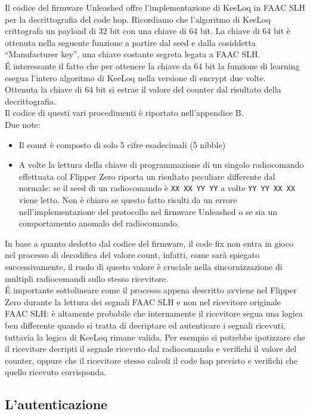 Il codice del firmware Unleashed offre l’implementazione di KeeLoq in FAAC SLH per la decrittografia del code hop. Ricordiamo che l’algoritmo di KeeLoq crittografa un payload di 32 bit con una chiave di 64 bit. La chiave di 64 bit è ottenuta nella seguente funzione a partire dal seed e dalla cosiddetta “Manufacturer key”, una chiave costante segreta legata a FAAC SLH.\\
É interessante il fatto che per ottenere la chiave da 64 bit la funzione di learning esegua l’intero algoritmo di KeeLoq nella versione di encrypt due volte.\\
Ottenuta la chiave di 64 bit si estrae il valore del counter dal risultato della decrittografia.\\
Il codice di questi vari procedimenti è riportato nell'appendice B.\\
Due note:
\begin{itemize}
  \item Il count è composto di solo 5 cifre esadecimali (5 nibble)
  \item A volte la lettura della chiave di programmazione di un singolo radiocomando effettuata col Flipper Zero riporta un risultato peculiare differente dal normale: se il seed di un radiocomando è \texttt{XX XX YY YY} a volte \texttt{YY YY XX XX} viene letto. Non è chiaro se questo fatto risulti da un errore nell’implementazione del protocollo nel firmware Unleashed o se sia un comportamento anomalo del radiocomando.
\end{itemize}
In base a quanto dedotto dal codice del firmware, il code fix non entra in gioco nel processo di decodifica del valore count, infatti, come sarà spiegato successivamente, il ruolo di questo valore è cruciale nella sincornizzazione di multipli radiocomandi sullo stesso ricevitore.\\
É importante sottolineare come il processo appena descritto avviene nel Flipper Zero durante la lettura dei segnali FAAC SLH e non nel ricevitore originale FAAC SLH: è altamente probabile che internamente il ricevitore segua una logica ben differente quando si tratta di decriptare ed autenticare i segnali ricevuti, tuttavia la logica di KeeLoq rimane valida. Per esempio si potrebbe ipotizzare che il ricevitore decripti il segnale ricevuto dal radiocomando e verifichi il valore del counter, oppure che il ricevitore stesso calcoli il code hop previsto e verifichi che quello ricevuto corrisponda.\\

\subsection{L'autenticazione}
\label{sub:auth}


